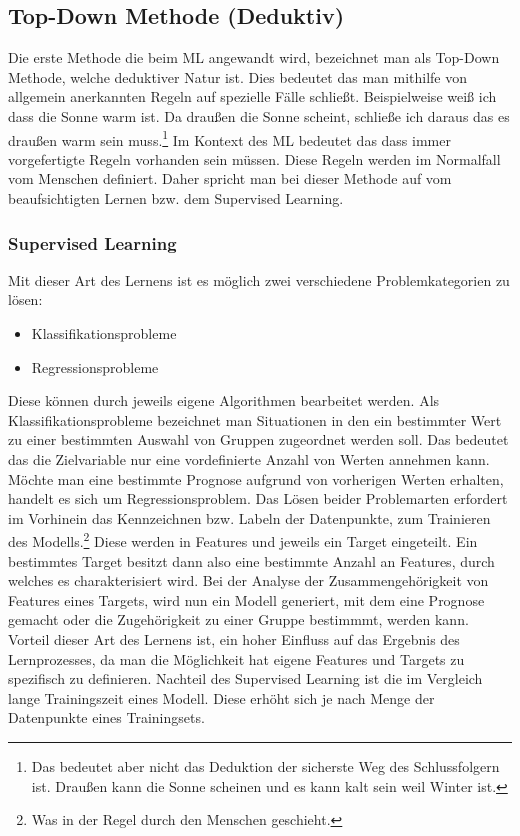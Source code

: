 \documentclass[12pt,german,ngerman]{report}
\begin{document}
    \subsection{Top-Down Methode (Deduktiv)}
        Die erste Methode die beim ML angewandt wird, bezeichnet man als Top-Down Methode,
        welche deduktiver Natur ist. Dies bedeutet das man mithilfe von allgemein anerkannten Regeln
        auf spezielle Fälle schließt.\cite{dundi2021unileipzig} 
        Beispielweise weiß ich dass die Sonne warm ist. Da draußen die Sonne scheint, schließe ich daraus
        das es draußen warm sein muss.\footnote{Das bedeutet aber nicht das Deduktion der sicherste Weg des 
        Schlussfolgern ist. Draußen kann die Sonne scheinen und es kann kalt sein weil Winter ist.}
        Im Kontext des ML bedeutet das dass immer vorgefertigte Regeln vorhanden sein müssen.
        Diese Regeln werden im Normalfall vom Menschen definiert. Daher spricht man bei dieser Methode
        auf vom beaufsichtigten Lernen bzw. dem Supervised Learning.
        \subsubsection{Supervised Learning}
            Mit dieser Art des Lernens ist es möglich zwei verschiedene 
            Problemkategorien zu lösen:\cite{supervisedlearning2021ibm}
            \begin{itemize}
                \item{Klassifikationsprobleme}
                \item{Regressionsprobleme}
            \end{itemize}
            Diese können durch jeweils eigene Algorithmen bearbeitet werden.
            Als Klassifikationsprobleme bezeichnet man Situationen in den ein bestimmter Wert zu einer
            bestimmten Auswahl von Gruppen zugeordnet werden soll. Das bedeutet das die Zielvariable
            nur eine vordefinierte Anzahl von Werten annehmen kann.\cite{kibuisness2021supervised}
            Möchte man eine bestimmte Prognose aufgrund von vorherigen Werten erhalten,
            handelt es sich um Regressionsproblem.\cite{kibuisness2021supervised}
            Das Lösen beider Problemarten erfordert im Vorhinein das Kennzeichnen bzw. Labeln der Datenpunkte, zum Trainieren des Modells.\footnote{Was in der Regel durch den Menschen geschieht.}
            Diese werden in Features und jeweils ein Target eingeteilt. Ein bestimmtes Target
            besitzt dann also eine bestimmte Anzahl an Features, durch welches es charakterisiert wird.
            Bei der Analyse der Zusammengehörigkeit von Features eines Targets, wird nun ein Modell
            generiert, mit dem eine Prognose gemacht oder die Zugehörigkeit zu einer Gruppe bestimmmt, werden kann.
            Vorteil dieser Art des Lernens ist, ein hoher Einfluss auf das Ergebnis des Lernprozesses,
            da man die Möglichkeit hat eigene Features und Targets zu spezifisch zu definieren.
            Nachteil des Supervised Learning ist die im Vergleich lange Trainingszeit eines Modell.
            Diese erhöht sich je nach Menge der Datenpunkte eines Trainingsets.
            
\end{document}
